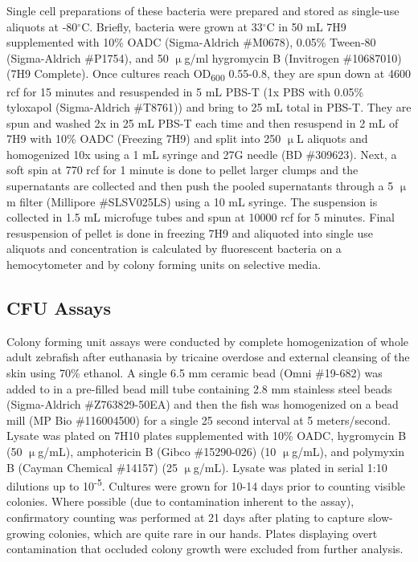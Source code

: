 Single cell preparations of these bacteria were prepared and stored as single\hyp{}use aliquots at \hyp{}80$^{\circ}$C. Briefly, bacteria were grown at 33$^{\circ}$C in 50 mL 7H9 supplemented with 10\% OADC (Sigma\hyp{}Aldrich \#M0678), 0.05\% Tween\hyp{}80 (Sigma\hyp{}Aldrich \#P1754), and 50 $\upmu$g/ml hygromycin B (Invitrogen \#10687010) (7H9 Complete). Once cultures reach OD\textsubscript{600} 0.55\hyp{}0.8, they are spun down at 4600 rcf for 15 minutes and resuspended in 5 mL PBS\hyp{}T (1x PBS with 0.05\% tyloxapol (Sigma\hyp{}Aldrich \#T8761)) and bring to 25 mL total in PBS\hyp{}T. They are spun and washed 2x in 25 mL PBS\hyp{}T each time and then resuspend in 2 mL of 7H9 with 10\% OADC (Freezing 7H9) and split into 250 $\upmu$L aliquots and homogenized 10x using a 1 mL syringe and 27G needle (BD \#309623). Next, a soft spin at 770 rcf for 1 minute is done to pellet larger clumps and the supernatants are collected and then push the pooled supernatants through a 5 $\upmu$m filter (Millipore \#SLSV025LS) using a 10 mL syringe. The suspension is collected in 1.5 mL microfuge tubes and spun at 10000 rcf for 5 minutes. Final resuspension of pellet is done in freezing 7H9 and aliquoted into single use aliquots and concentration is calculated by fluorescent bacteria on a hemocytometer and by colony forming units on selective media.

\subsection{CFU Assays}\label{cfuassay}

Colony forming unit assays were conducted by complete homogenization of whole adult zebrafish after euthanasia by tricaine overdose and external cleansing of the skin using 70\% ethanol. A single 6.5 mm ceramic bead (Omni \#19\hyp{}682) was added to in a pre\hyp{}filled bead mill tube containing 2.8 mm stainless steel beads (Sigma\hyp{}Aldrich \#Z763829\hyp{}50EA) and then the fish was homogenized on a bead mill (MP Bio \#116004500) for a single 25 second interval at 5 meters/second. Lysate was plated on 7H10 plates supplemented with 10\% OADC, hygromycin B (50 $\upmu$g/mL), amphotericin B (Gibco \#15290\hyp{}026) (10 $\upmu$g/mL), and polymyxin B (Cayman Chemical \#14157) (25 $\upmu$g/mL). Lysate was plated in serial 1:10 dilutions up to 10\textsuperscript{\hyp{}5}. Cultures were grown for 10\hyp{}14 days prior to counting visible colonies. Where possible (due to contamination inherent to the assay), confirmatory counting was performed at 21 days after plating to capture slow\hyp{}growing colonies, which are quite rare in our hands. Plates displaying overt contamination that occluded colony growth were excluded from further analysis.

